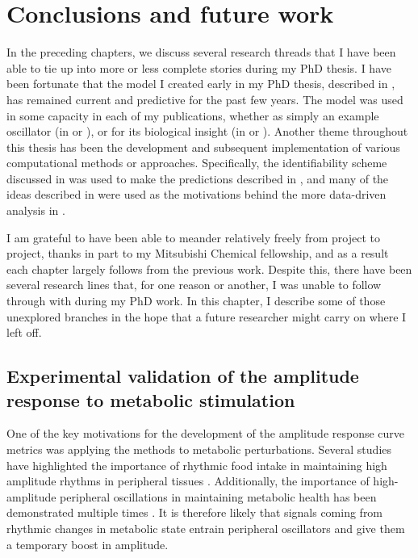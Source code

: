 \chapter{Conclusions and future work}

In the preceding chapters, we discuss several research threads that I have been able to tie up into more or less complete stories during my PhD thesis.
I have been fortunate that the model I created early in my PhD thesis, described in , has remained current and predictive for the past few years.
The model was used in some capacity in each of my publications, whether as simply an example oscillator (in  or ), or for its biological insight (in  or ).
Another theme throughout this thesis has been the development and subsequent implementation of various computational methods or approaches.
Specifically, the identifiability scheme discussed in  was used to make the predictions described in , and many of the ideas described in  were used as the motivations behind the more data-driven analysis in .

I am grateful to have been able to meander relatively freely from project to project, thanks in part to my Mitsubishi Chemical fellowship, and as a result each chapter largely follows from the previous work.
Despite this, there have been several research lines that, for one reason or another, I was unable to follow through with during my PhD work.
In this chapter, I describe some of those unexplored branches in the hope that a future researcher might carry on where I left off.

\section{Experimental validation of the amplitude response to metabolic stimulation}\label{sec:chida}

One of the key motivations for the development of the amplitude response curve metrics was applying the methods to metabolic perturbations.
Several studies have highlighted the importance of rhythmic food intake in maintaining high amplitude rhythms in peripheral tissues \cite{Vollmers2009, Hatori2012}.
Additionally, the importance of high-amplitude peripheral oscillations in maintaining metabolic health has been demonstrated multiple times \cite{Hatori2012, Marcheva2010}.
It is therefore likely that signals coming from rhythmic changes in metabolic state entrain peripheral oscillators and give them a temporary boost in amplitude.

